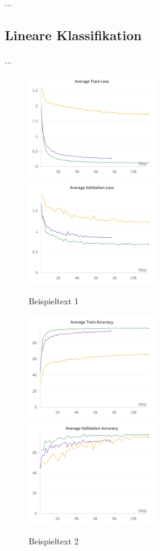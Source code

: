 ...

\subsection{Lineare Klassifikation} \label{sec:supcon-lin-results}

...

\begin{figure}
	\centering
	\includegraphics[width=0.5\textwidth]{figure_results_supcon-lin_avg-train-loss.png}%
	\includegraphics[width=0.5\textwidth]{figure_results_supcon-lin_avg-val-loss.png}
	\caption{Beispieltext 1}
	\label{fig:supcon-lin-loss}
\end{figure}
\begin{figure}
	\centering
	\includegraphics[width=0.5\textwidth]{figure_results_supcon-lin_avg-train-acc.png}%
	\includegraphics[width=0.5\textwidth]{figure_results_supcon-lin_avg-val-acc.png}
	\caption{Beispieltext 2}
	\label{fig:supcon-lin-acc}
\end{figure}
